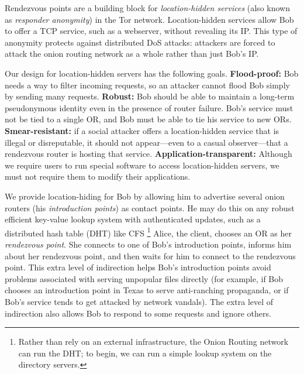 \documentclass[times,10pt,twocolumn]{article}
\begin{document}
\label{sec:rendezvous}

Rendezvous points are a building block for \emph{location-hidden
services} (also known as \emph{responder anonymity}) in the Tor
network.  Location-hidden services allow Bob to offer a TCP
service, such as a webserver, without revealing its IP.
This type of anonymity protects against distributed DoS attacks:
attackers are forced to attack the onion routing network as a whole
rather than just Bob's IP.

Our design for location-hidden servers has the following goals.
\textbf{Flood-proof:} Bob needs a way to filter incoming requests,
so an attacker cannot flood Bob simply by sending many requests.
\textbf{Robust:} Bob should be able to maintain a long-term pseudonymous
identity even in the presence of router failure. Bob's service must
not be tied to a single OR, and Bob must be able to tie his service
to new ORs. \textbf{Smear-resistant:} if a social attacker offers a
location-hidden service that is illegal or disreputable, it should not
appear---even to a casual observer---that a rendezvous router is hosting
that service. \textbf{Application-transparent:} Although we require users
to run special software to access location-hidden servers, we must not
require them to modify their applications.

We provide location-hiding for Bob by allowing him to advertise
several onion routers (his \emph{introduction points}) as contact
points. He may do this on any robust efficient
key-value lookup system with authenticated updates, such as a
distributed hash table (DHT) like CFS \cite{cfs:sosp01}\footnote{
Rather than rely on an external infrastructure, the Onion Routing network
can run the DHT; to begin, we can run a simple lookup system on the
directory servers.} Alice, the client, chooses an OR as her
\emph{rendezvous point}. She connects to one of Bob's introduction
points, informs him about her rendezvous point, and then waits for him
to connect to the rendezvous point. This extra level of indirection
helps Bob's introduction points avoid problems associated with serving
unpopular files directly (for example, if Bob chooses
an introduction point in Texas to serve anti-ranching propaganda,
or if Bob's service tends to get attacked by network vandals).
The extra level of indirection also allows Bob to respond to some requests
and ignore others.
\end{document}
